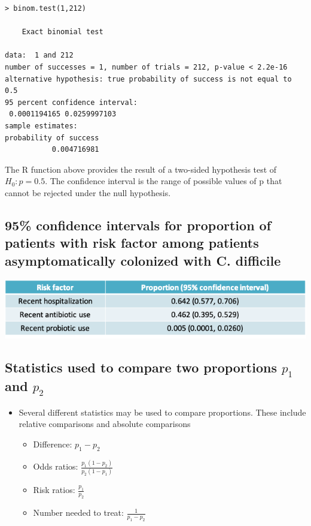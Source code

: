 \documentclass[
]{book}
\providecommand{\tightlist}{%
  \setlength{\itemsep}{0pt}\setlength{\parskip}{0pt}}
\begin{document}
\begin{verbatim}
> binom.test(1,212)

    Exact binomial test

data:  1 and 212
number of successes = 1, number of trials = 212, p-value < 2.2e-16
alternative hypothesis: true probability of success is not equal to 0.5
95 percent confidence interval:
 0.0001194165 0.0259997103
sample estimates:
probability of success 
           0.004716981
\end{verbatim}

The R function above provides the result of a two-sided hypothesis test of \(H_0: p=0.5\). The confidence interval is the range of possible values of p that cannot be rejected under the null hypothesis.

\hypertarget{confidence-intervals-for-proportion-of-patients-with-risk-factor-among-patients-asymptomatically-colonized-with-c.-difficile}{%
\subsection{95\% confidence intervals for proportion of patients with risk factor among patients asymptomatically colonized with C. difficile}\label{confidence-intervals-for-proportion-of-patients-with-risk-factor-among-patients-asymptomatically-colonized-with-c.-difficile}}

\includegraphics[width=1\linewidth]{./7_38}

\hypertarget{statistics-used-to-compare-two-proportions-p_1-and-p_2}{%
\subsection{\texorpdfstring{Statistics used to compare two proportions \(p_1\) and \(p_2\)}{Statistics used to compare two proportions p\_1 and p\_2}}\label{statistics-used-to-compare-two-proportions-p_1-and-p_2}}

\begin{itemize}
\tightlist
\item
  Several different statistics may be used to compare proportions. These include relative comparisons and absolute comparisons

  \begin{itemize}
  \tightlist
  \item
    Difference: \(p_1-p_2\)
  \item
    Odds ratios: \(\frac{p_1(1-p_2)}{p_2(1-p_1)}\)
  \item
    Risk ratios: \(\frac{p_1}{p_2}\)
  \item
    Number needed to treat: \(\frac{1}{p_1-p_2}\)
  \end{itemize}
\end{itemize}
\end{document}
